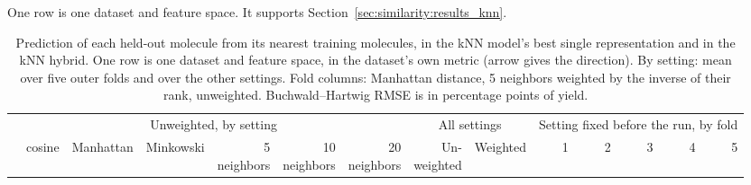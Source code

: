
\begin{landscape}
\label{app:add:similarity_knn_by_setting}
One row is one dataset and feature space. It supports Section~\ref{sec:similarity:results_knn}.

\setlength{\tabcolsep}{3pt}
\begin{longtable}{@{}lrrrrrrrrrrrrr@{}}
\caption[Prediction from nearest neighbors by setting and by fold]{Prediction of each held-out molecule from its nearest training molecules, in the kNN model's best single representation and in the kNN hybrid. One row is one dataset and feature space, in the dataset's own metric (arrow gives the direction). By setting: mean over five outer folds and over the other settings. Fold columns: Manhattan distance, 5 neighbors weighted by the inverse of their rank, unweighted. Buchwald--Hartwig RMSE is in percentage points of yield.}
\label{tab:similarity:knn_by_setting} \\
\toprule
 & \multicolumn{6}{c}{Unweighted, by setting} & \multicolumn{2}{c}{All settings} & \multicolumn{5}{c}{Setting fixed before the run, by fold} \\
\cmidrule(lr){2-7}\cmidrule(lr){8-9}\cmidrule(l){10-14}
 & cosine & Manhattan & Minkowski & \makecell[r]{5\\neighbors} & \makecell[r]{10\\neighbors} & \makecell[r]{20\\neighbors} & \makecell[r]{Un-\\weighted} & Weighted & 1 & 2 & 3 & 4 & 5 \\

\end{longtable}
\end{landscape}
